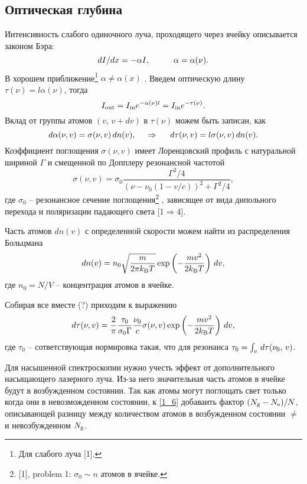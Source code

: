 \subsection{Оптическая глубина}


Интенсивность слабого одиночного луча, проходящего через ячейку описывается законом Бэра:
\begin{equation*}
    d I / d x = - \alpha I,
    \hspace{10 mm} 
    \alpha = \alpha (\nu).
\end{equation*}
В хорошем приближение\footnote{
    Для слабого луча [1].
}  $\alpha \neq \alpha(x)$ . 
Введем оптическую длину $\tau(\nu) = l \alpha(\nu)$, тогда
\begin{equation*}
    I_{\textnormal{out}} = I_{\textnormal{in}} e^{- \alpha(\nu) l} = I_{\textnormal{in}} e^{- \tau(\nu)}.
\end{equation*}
Вклад от группы атомов $(v,\, v + d v)$ в $\tau(\nu)$ можем быть записан, как
\begin{equation*}
    d \alpha (\nu, v) = \sigma(\nu, v) \, dn(v),
    \hspace{0.5cm} \Rightarrow \hspace{0.5cm}    
    d \tau(\nu, v) = l \sigma(\nu, v) \, dn(v).
\end{equation*}
Коэффициент поглощения $\sigma(\nu, v)$ имеет Лоренцовский профиль с натуральной шириной $\Gamma$ и смещенной по Допплеру резонансной частотой
\begin{equation}
    \label{1_4}
    \sigma(\nu, v) = \sigma_0 \frac{\Gamma^2/4}{(\nu - \nu_0(1 - v / c))^2 + \Gamma^2/4},
\end{equation}
где $\sigma_0$ -- резонансное сечение поглощения\footnote{
    [1], problem 1: $\sigma_0 \sim n$ атомов в ячейке.
} , зависящее от вида дипольного перехода и поляризации падающего света [1$\Rightarrow$4]. 

Часть атомов $d n (v)$ с определенной скорости можем найти из распределения Больцмана
\begin{equation*}
    d n(v) = n_0 \sqrt{\frac{m}{2 \pi k_{\textnormal{B}} T}} \exp\left(
        - \frac{m v^2}{2 k_{\textnormal{B}} T} 
    \right) \, d v,
\end{equation*} 
где $n_0 = N/V$ -- концентрация атомов в ячейке. 

Собирая все вместе (?) приходим к выражению
\begin{equation}
    \label{1_6}
    d \tau (\nu, v) = \frac{2}{\pi} \frac{\tau_0}{\sigma_0 \Gamma} \frac{\nu_0}{c} 
     \sigma(\nu, v) \exp\left(
        - \frac{m v^2}{2 k_{\textnormal{B}} T}
     \right) \, d v,
\end{equation}
где $\tau_0$  -- сответствующая нормировка такая, что для резонанса $\tau_0 = \int_v \, d \tau (\nu_0,\, v)$.



Для насышенной спектроскопии нужно учесть эффект от дополнительного насыщающего лазерного луча. Из-за него значительная часть атомов в ячейке будут в возбужденном состоянии. Так как атомы могут поглощать свет только когда они в невозможденном состоянии, к \eqref{1_6} добаваить фактор $(N_{\textnormal{g}}-N_{\textnormal{e}})/N$, описывающей разницу 
между количеством атомов в возбужденном состоянии $\ne$ и невозбужденном $N_{\textnormal{g}}$. 

